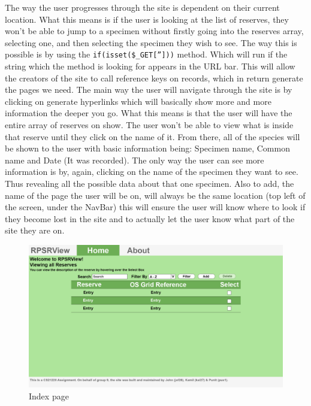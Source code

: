 \documentclass[12pt]{article}
\begin{document}
	  The way the user progresses through the site is dependent on their current location. What this means is if the user is looking at the list of reserves, they won’t be able to jump to a specimen without firstly going into the reserves array, selecting one, and then selecting the specimen they wish to see. The way this is possible is by using the \texttt{if(isset(\$\_GET['']))} method. Which will run if the string which the method is looking for appears in the URL bar. This will allow the creators of the site to call reference keys on records, which in return generate the pages we need. The main way the user will navigate through the site is by clicking on generate hyperlinks which will basically show more and more information the deeper you go. What this means is that the user will have the entire array of reserves on show. The user won’t be able to view what is inside that reserve until they click on the name of it. From there, all of the species will be shown to the user with basic information being: Specimen name, Common name and Date (It was recorded). The only way the user can see more information is by, again, clicking on the name of the specimen they want to see. Thus revealing all the possible data about that one specimen. Also to add, the name of the page the user will be on, will always be the same location (top left of the screen, under the NavBar) this will ensure the user will know where to look if they become lost in the site and to actually let the user know what part of the site they are on.

	  \begin{figure}[H]
			\begin{center}
				\includegraphics[scale=0.20]{web-IndexPLAN}
			\end{center}
			\caption{Index page}
			\label{fig:index-page}
		\end{figure}
\end{document}
